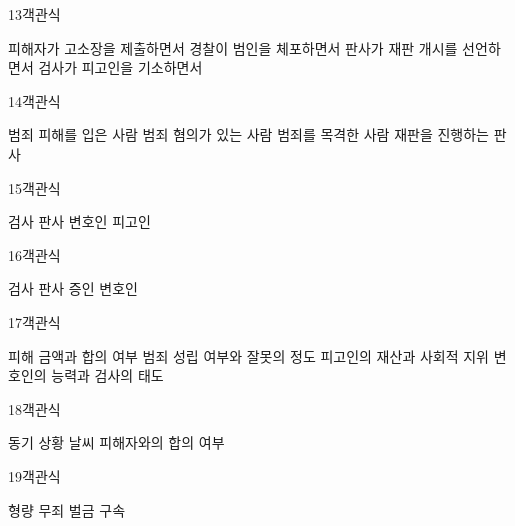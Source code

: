 \documentclass[fs9,seriesRus]{korfarm-base}
\begin{document}
\begin{kfQBlock}{13}{객관식}
\begin{kfChoices}
\kfChoice 피해자가 고소장을 제출하면서
\kfChoice 경찰이 범인을 체포하면서
\kfChoice 판사가 재판 개시를 선언하면서
\kfChoice 검사가 피고인을 기소하면서
\end{kfChoices}
\end{kfQBlock}
\begin{kfQBlock}{14}{객관식}
\begin{kfChoices}
\kfChoice 범죄 피해를 입은 사람
\kfChoice 범죄 혐의가 있는 사람
\kfChoice 범죄를 목격한 사람
\kfChoice 재판을 진행하는 판사
\end{kfChoices}
\end{kfQBlock}
\begin{kfQBlock}{15}{객관식}
\begin{kfChoices}
\kfChoice 검사
\kfChoice 판사
\kfChoice 변호인
\kfChoice 피고인
\end{kfChoices}
\end{kfQBlock}
\begin{kfQBlock}{16}{객관식}
\begin{kfChoices}
\kfChoice 검사
\kfChoice 판사
\kfChoice 증인
\kfChoice 변호인
\end{kfChoices}
\end{kfQBlock}
\begin{kfQBlock}{17}{객관식}
\begin{kfChoices}
\kfChoice 피해 금액과 합의 여부
\kfChoice 범죄 성립 여부와 잘못의 정도
\kfChoice 피고인의 재산과 사회적 지위
\kfChoice 변호인의 능력과 검사의 태도
\end{kfChoices}
\end{kfQBlock}
\begin{kfQBlock}{18}{객관식}
\begin{kfChoices}
\kfChoice 동기
\kfChoice 상황
\kfChoice 날씨
\kfChoice 피해자와의 합의 여부
\end{kfChoices}
\end{kfQBlock}
\begin{kfQBlock}{19}{객관식}
\begin{kfChoices}
\kfChoice 형량
\kfChoice 무죄
\kfChoice 벌금
\kfChoice 구속
\end{kfChoices}
\end{kfQBlock}
\end{document}
